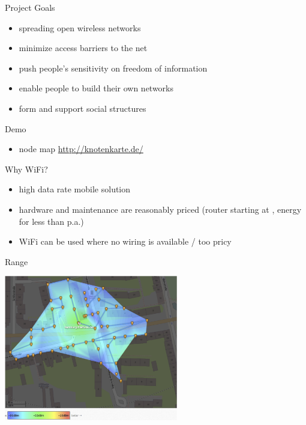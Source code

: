 \documentclass[c]{beamer}
\begin{document}
\begin{frame}{Project Goals}
	\begin{itemize}
		\item spreading open wireless networks
		\item minimize access barriers to the net
		\item push people's sensitivity on freedom of information
		\item enable people to build their own networks
		\item form and support social structures
	\end{itemize}
\end{frame}


\begin{frame}{Demo}
	\begin{itemize}
		\item node map \href{http://knotenkarte.de/}{http://knotenkarte.de/}
	\end{itemize}
\end{frame}



\begin{frame}{Why WiFi?}
	\begin{itemize}
		\item high data rate mobile solution
		\item hardware and maintenance are reasonably priced (router starting at , energy for less than  p.a.)
		\item WiFi can be used where no wiring is available / too pricy
	\end{itemize}
\end{frame}


\begin{frame}{Range}
	\begin{center}
		\includegraphics[height=180pt]{Bilder/Reichweite_altona001}
	\end{center}
\end{frame}
\end{document}
